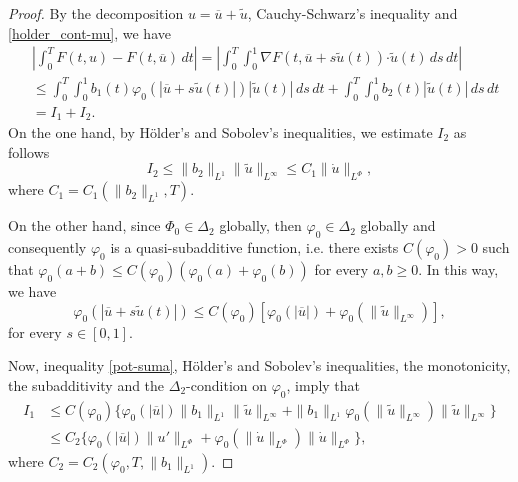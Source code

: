 \documentclass[twoside]{article}
\theoremstyle{remark}
\newcommand{\orlnor}{\|_{L^{\Phi}}}
\renewcommand{\b}[1]{\boldsymbol{#1}}
\newcommand{\ccdot}{\b{\cdot}}
\renewcommand{\leq}{\leqslant}
\renewcommand{\geq}{\geqslant}
\begin{document}
\begin{proof}
By the decomposition $u=\overline{u}+\tilde{u}$,   Cauchy-Schwarz's inequality
and \eqref{holder_cont-mu}, we have
\begin{equation}\label{cota-diferencia-F}
\begin{split}
&\left|\int_0^T F(t,u)-F(t,\overline{u})\,dt\right|=
\left|\int_0^T \int_0^1 \nabla F(t,\overline{u}+s\tilde{u}(t))\ccdot \tilde{u}(t) \,ds \,dt\right|
\\
&\leq \int_0^T \int_0^1 b_1(t)\varphi_0(|\overline{u}+s\tilde{u}(t)|)|\tilde{u}(t)|\,ds\,dt+
\int_0^T \int_0^1 b_2(t)|\tilde{u}(t)|\,ds\,dt
\\
&=I_1+I_2.
\end{split}
\end{equation}
On the one hand, by H\"older's and Sobolev's inequalities, we estimate $I_2$ as follows
\begin{equation}\label{cota-i2}
I_2\leq \|b_2\|_{L^1} \|\tilde{u}\|_{L^{\infty}}\leq
C_1\|\dot{u}\orlnor,
\end{equation}
 where $C_1=C_1(\|b_2\|_{L^1}, T)$. 

On the other hand, since $\Phi_0 \in \Delta_2$ globally, then $\varphi_0 \in \Delta_2$ globally and 
consequently $\varphi_0$ is a quasi-subadditive function, i.e. there exists $C(\varphi_0)>0$ such that 
$\varphi_0(a+b)\leq C(\varphi_0)(\varphi_0(a)+\varphi_0(b))$ for every $a,b\geq 0$.
In this way, we have
\begin{equation}\label{pot-suma}
\varphi_0(|\overline{u}+s\tilde{u}(t)|)\leq
C(\varphi_0)[\varphi_0(|\overline{u}|)+\varphi_0(\|\tilde{u}\|_{L^{\infty}})],
\end{equation}
for every $s \in [0,1]$. 

Now,  inequality \eqref{pot-suma}, H\"older's and Sobolev's inequalities,
 the monotonicity, the subadditivity and  the $\Delta_2$-condition on $\varphi_0$, imply that
\begin{equation}\label{cota-i1}
\begin{split}
I_1&
\leq C(\varphi_0)\bigg\{ \varphi_0(|\overline{u}|) \|b_1\|_{L^1} \|\tilde{u}\|_{L^{\infty}}+
 \|b_1\|_{L^1}\varphi_0(\|\tilde{u}\|_{L^\infty})\|\tilde{u}\|_{L^\infty}\bigg\}
\\
&\leq C_2 \bigg\{ \varphi_0(|\overline{u}|) \|u'\orlnor
+\varphi_0(\|\dot{u}\orlnor) \|\dot{u}\orlnor\bigg\},
\end{split}
\end{equation}
where $C_2=C_2(\varphi_0,T, \|b_1\|_{L^1} )$. 


\end{proof}
\end{document}
